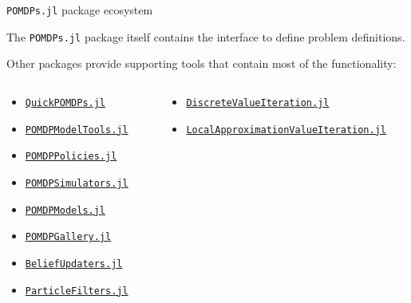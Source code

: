\begin{frame}[fragile]{\texttt{POMDPs.jl} package ecosystem}

\begin{highlightblock}
The \texttt{POMDPs.jl} package itself contains the interface to define problem definitions.
\end{highlightblock}

\phantom{}

Other packages provide supporting tools that contain most of the functionality:

\begin{columns}[T,onlytextwidth]
    \begin{column}{0.24\linewidth}
        {\scriptsize
        \begin{itemize}
            \item {\color{julia_green}\href{https://github.com/JuliaPOMDP/QuickPOMDPs.jl}{\texttt{QuickPOMDPs.jl}}}
            \item {\color{julia_blue}\href{https://github.com/JuliaPOMDP/POMDPModelTools.jl}{\texttt{POMDPModelTools.jl}}}
            \item {\color{julia_red}\href{https://github.com/JuliaPOMDP/POMDPPolicies.jl}{\texttt{POMDPPolicies.jl}}}
            \item {\color{julia_green}\href{https://github.com/JuliaPOMDP/POMDPSimulators.jl}{\texttt{POMDPSimulators.jl}}}
            \item {\color{julia_purple}\href{https://github.com/JuliaPOMDP/POMDPModels.jl}{\texttt{POMDPModels.jl}}}
            \item {\color{julia_blue}\href{https://github.com/JuliaPOMDP/POMDPGallery.jl}{\texttt{POMDPGallery.jl}}}
            \item {\color{julia_red}\href{https://github.com/JuliaPOMDP/BeliefUpdaters.jl}{\texttt{BeliefUpdaters.jl}}}
            \item {\color{julia_green}\href{https://github.com/JuliaPOMDP/ParticleFilters.jl}{\texttt{ParticleFilters.jl}}}
        \end{itemize}
        }
    \end{column}
    \begin{column}{0.40\linewidth}
        {\scriptsize
        \begin{itemize}
            \item {\color{julia_blue}\href{https://github.com/JuliaPOMDP/DiscreteValueIteration.jl}{\texttt{DiscreteValueIteration.jl}}}
            \item {\color{julia_red}\href{https://github.com/JuliaPOMDP/LocalApproximationValueIteration.jl}{\texttt{LocalApproximationValueIteration.jl}}}

\end{itemize}}
\end{column}
\end{columns}
\end{frame}
